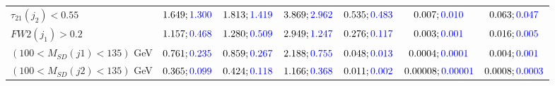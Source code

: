 \begin{landscape}
\begin{table}
\begin{tabular}{lcccccc}
			\rowcolor{black!7}$\tau_{21}(j_2)<0.55$ &$1.649;\textcolor{blue}{1.300}$ &$1.813;\textcolor{blue}{1.419}$ &$3.869;\textcolor{blue}{2.962}$&$0.535;\textcolor{blue}{0.483}$&$0.007;\textcolor{blue}{0.010}$&$0.063;\textcolor{blue}{0.047}$\\
			$FW2(j_1)>0.2$ &$1.157;\textcolor{blue}{0.468}$ &$1.280;\textcolor{blue}{0.509}$&$2.949;\textcolor{blue}{1.247}$&$0.276;\textcolor{blue}{0.117}$&$0.003;\textcolor{blue}{0.001}$&$0.016;\textcolor{blue}{0.005}$\\
			\rowcolor{black!7}$(100<M_{SD}(j1)<135)$ GeV& $0.761;\textcolor{blue}{0.235}$&$0.859;\textcolor{blue}{0.267}$&$2.188;\textcolor{blue}{0.755}$&$0.048;\textcolor{blue}{0.013}$&$0.0004;\textcolor{blue}{0.0001}$&$0.004;\textcolor{blue}{0.001}$\\
			$(100<M_{SD}(j2)<135)$ GeV &$0.365;\textcolor{blue}{0.099}$ &$0.424;\textcolor{blue}{0.118}$ &$1.166;\textcolor{blue}{0.368}$&$0.011;\textcolor{blue}{0.002}$&$0.00008;\textcolor{blue}{0.00001}$&$0.0008;\textcolor{blue}{0.0003}$\\
			\bottomrule
		\end{tabular}
	\end{table}


\end{landscape}
